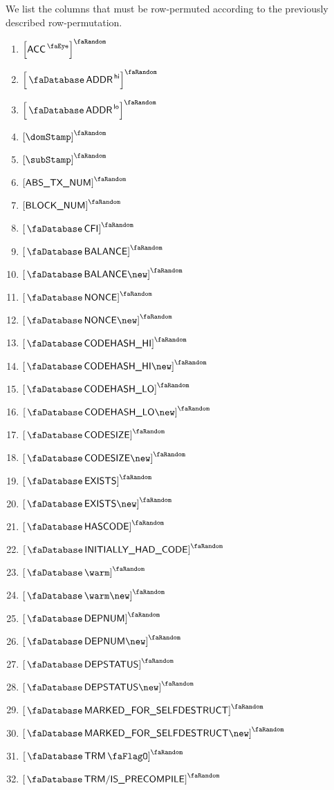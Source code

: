 We list the columns that must be row-permuted according to the previously described row-permutation.
\begin{multicols}{3}
	\begin{enumerate}
		\item $\order{\peekAccount}$
		\item $\order{\accAddress\high}$
		\item $\order{\accAddress\low}$
		\item $\order{\domStamp}$
		\item $\order{\subStamp}$
		\item $\order{\absTxNum}$
		\item $\order{\relBlockNum}$
		\item $\order{\accCfi}$
		\item $\order{\accBalance}$
		\item $\order{\accBalance\new}$
		\item $\order{\accNonce}$
		\item $\order{\accNonce\new}$
		\item $\order{\accCodehashHi}$
		\item $\order{\accCodehashHi\new}$
		\item $\order{\accCodehashLo}$
		\item $\order{\accCodehashLo\new}$
		\item $\order{\accCodesize}$
		\item $\order{\accCodesize\new}$
		\item $\order{\accExists}$
		\item $\order{\accExists\new}$
		\item $\order{\accHasCode}$
		\item $\order{\accInitiallyHadCode}$
		\item $\order{\accWarmth}$
		\item $\order{\accWarmth\new}$
		\item $\order{\accDeploymentNumber}$
		\item $\order{\accDeploymentNumber\new}$
		\item $\order{\accDeploymentStatus}$
		\item $\order{\accDeploymentStatus\new}$
		\item $\order{\accMarkedForSelfdestruct}$
		\item $\order{\accMarkedForSelfdestruct\new}$
		\item $\order{\accTrmFlag}$
		\item $\order{\accTrmIsPrecompile}$
	\end{enumerate}
\end{multicols}
